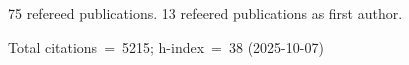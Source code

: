 75 refereed publications. 13 refeered publications as first author.

Total citations~=~5215; h-index~=~38 (2025-10-07)